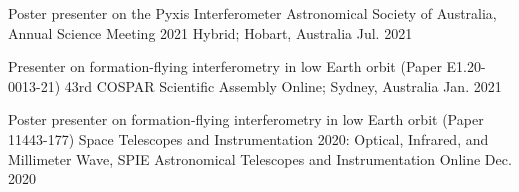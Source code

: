\begin{cventries}
    \cventry
    {Poster presenter on the Pyxis Interferometer} %
    {Astronomical Society of Australia, Annual Science Meeting 2021} %
    {Hybrid; Hobart, Australia} %
    {Jul. 2021} %
    {}
      \vspace{-0.2cm}  
      
    \cventry
    {Presenter on formation-flying interferometry in low Earth orbit (Paper E1.20-0013-21)} %
    {43rd COSPAR Scientific Assembly} %
    {Online; Sydney, Australia} %
    {Jan. 2021} %
    {}
     \vspace{-0.2cm}         
      
  \cventry
    {Poster presenter on formation-flying interferometry in low Earth orbit (Paper 11443-177)} %
    {Space Telescopes and Instrumentation 2020: Optical, Infrared, and Millimeter Wave, SPIE Astronomical Telescopes and Instrumentation} %
    {Online} %
    {Dec. 2020} %
    {}
    \vspace{-0.2cm}


\end{cventries}
